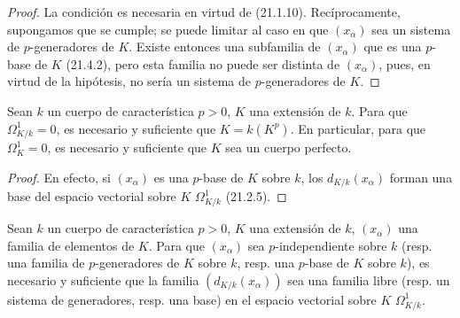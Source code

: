 \begin{proof}
La condición es necesaria en virtud de (21.1.10). Recíprocamente, supongamos que se
cumple; se puede limitar al caso en que $(x_\alpha)$ sea un sistema de
$p$-generadores de $K$. Existe entonces una subfamilia de $(x_\alpha)$ que es una
$p$-base de $K$ (21.4.2), pero esta familia no puede ser distinta de $(x_\alpha)$,
pues, en virtud de la hipótesis, no sería un sistema de $p$-generadores de $K$.
\end{proof}


\begin{corollary}[21.4.4]
\label{0.21.4.4-fr}
Sean $k$ un cuerpo de característica $p>0$, $K$ una extensión de $k$.
Para que $\Omega^1_{K/k}=0$, es necesario y suficiente que $K=k(K^p)$.
En particular, para que $\Omega^1_K=0$, es necesario y suficiente que $K$ sea
un cuerpo perfecto.
\end{corollary}

\begin{proof}
En efecto, si $(x_\alpha)$ es una $p$-base de $K$ sobre $k$, los
$d_{K/k}(x_\alpha)$ forman una base del espacio vectorial sobre $K$ $\Omega^1_{K/k}$
(21.2.5).
\end{proof}

\begin{theorem}[21.4.5]
\label{0.21.4.5-fr}
Sean $k$ un cuerpo de característica $p>0$, $K$ una extensión de $k$,
$(x_\alpha)$ una familia de elementos de $K$. Para que $(x_\alpha)$ sea
$p$-independiente sobre $k$ (\textup{resp.} una familia de $p$-generadores de $K$ sobre $k$,
\textup{resp.} una $p$-base de $K$ sobre $k$), es necesario y suficiente que la familia
$(d_{K/k}(x_\alpha))$ sea una familia libre (\textup{resp.} un sistema de
generadores, \textup{resp.} una base) en el espacio vectorial sobre $K$ $\Omega^1_{K/k}$.
\end{theorem}

